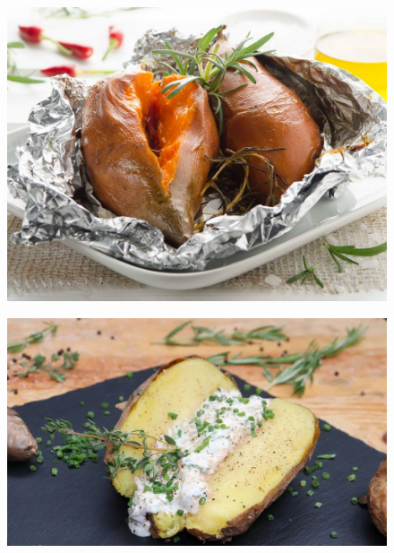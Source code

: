 \begin{figure}[htbp]
	\centering
	\begin{minipage}{1\textwidth}
		\centering
		\includegraphics[width=.9\linewidth]{pics/Suess}
		\label{fig:Suess}
	\end{minipage}
\end{figure}

\begin{figure}[htbp]
	\centering
	\begin{minipage}{1\textwidth}
		\centering
		\includegraphics[width=1\linewidth]{pics/Folienkartoffel}
		\label{fig:Folienkartoffel}
	\end{minipage}
\end{figure}
\newpage

